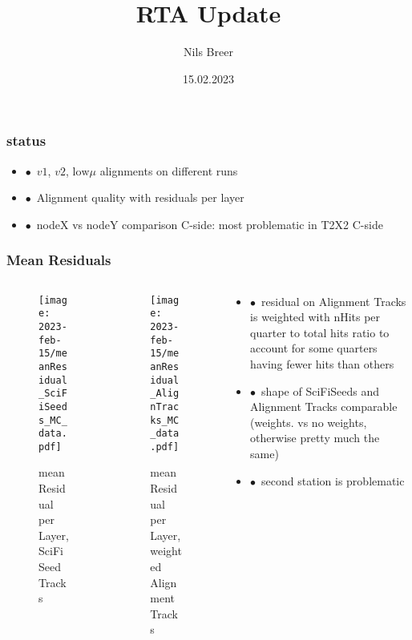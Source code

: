 \documentclass[aspectratio=1610, 12pt]{beamer}
\title{RTA Update}
\author[N.Breer]{Nils Breer}
\institute{Fakultät Physik}
\date{15.02.2023}
\begin{document}
\maketitle

\begin{frame}\frametitle{status}
  \begin{itemize}
    \item $\bullet$\, $v1$, $v2$, $\text{low}\mu$ alignments on different runs
    \item $\bullet$\, Alignment quality with residuals per layer
    \item $\bullet$\, nodeX vs nodeY comparison  C-side: most problematic in T2X2 C-side 
  \end{itemize}
\end{frame}

\begin{frame}\frametitle{Mean Residuals}
  \begin{columns}
    \begin{column}[c]{0.33\textwidth}
      \begin{figure}
        \centering
        \texttt{[image: 2023-feb-15/meanResidual\_SciFiSeeds\_MC\_data.pdf]}
        \caption{mean Residual per Layer, SciFi Seed Tracks}
      \end{figure}
    \end{column}
    \begin{column}[c]{0.33\textwidth}
      \begin{figure}
        \centering
        \texttt{[image: 2023-feb-15/meanResidual\_AlignTracks\_MC\_data.pdf]}
        \caption{mean Residual per Layer, weighted Alignment Tracks}
      \end{figure}
    \end{column}
    \begin{column}{0.33\textwidth}
      \begin{itemize}
        \item $\bullet$\, residual on Alignment Tracks is weighted with nHits per quarter to total hits ratio to account for some quarters having fewer hits than others
        \item $\bullet$\, shape of SciFiSeeds and Alignment Tracks comparable (weights. vs no weights, otherwise pretty much the same)
        \item $\bullet$\, second station is problematic
      \end{itemize}
    \end{column}
  \end{columns}
\end{frame}
\end{document}
